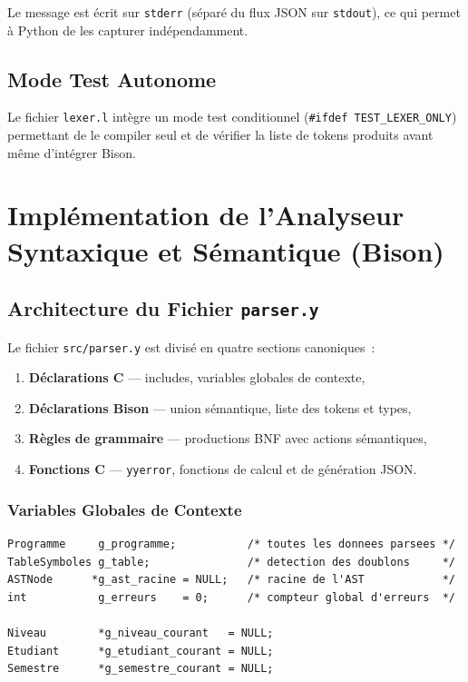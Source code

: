 \documentclass[a4paper,12pt]{article}
\begin{document}
Le message est écrit sur \texttt{stderr} (séparé du flux JSON sur \texttt{stdout}), ce qui permet à Python de les capturer indépendamment.

\subsection{Mode Test Autonome}

Le fichier \texttt{lexer.l} intègre un mode test conditionnel (\texttt{\#ifdef TEST\_LEXER\_ONLY}) permettant de le compiler seul et de vérifier la liste de tokens produits avant même d'intégrer Bison.

\section{Implémentation de l'Analyseur Syntaxique et Sémantique (Bison)}

\subsection{Architecture du Fichier \texttt{parser.y}}

Le fichier \texttt{src/parser.y} est divisé en quatre sections canoniques~:

\begin{enumerate}[leftmargin=1.5em]
  \item \textbf{Déclarations C} — includes, variables globales de contexte,
  \item \textbf{Déclarations Bison} — union sémantique, liste des tokens et types,
  \item \textbf{Règles de grammaire} — productions BNF avec actions sémantiques,
  \item \textbf{Fonctions C} — \texttt{yyerror}, fonctions de calcul et de génération JSON.
\end{enumerate}

\subsubsection{Variables Globales de Contexte}

\begin{lstlisting}[caption={Variables de contexte dans parser.y}, style=c, label=lst:globals]
Programme     g_programme;           /* toutes les donnees parsees */
TableSymboles g_table;               /* detection des doublons     */
ASTNode      *g_ast_racine = NULL;   /* racine de l'AST            */
int           g_erreurs    = 0;      /* compteur global d'erreurs  */

Niveau        *g_niveau_courant   = NULL;
Etudiant      *g_etudiant_courant = NULL;
Semestre      *g_semestre_courant = NULL;
\end{lstlisting}
\end{document}

